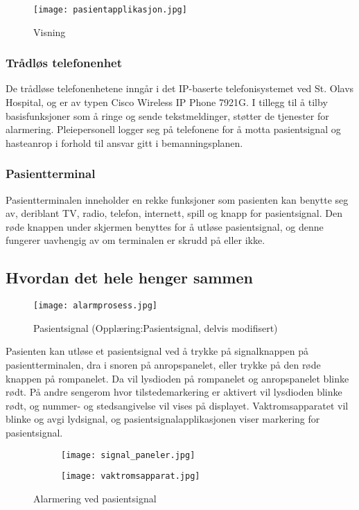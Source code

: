 \begin{figure}[H]
\centering
\texttt{[image: pasientapplikasjon.jpg]}
\caption{Visning}
\label{visning}
\end{figure}

\subsubsection{Trådløs telefonenhet}
De trådløse telefonenhetene inngår i det IP-baserte telefonisystemet ved St. Olavs Hospital, og er av typen Cisco Wireless IP Phone 7921G. I tillegg til å tilby basisfunksjoner som å ringe og sende tekstmeldinger, støtter de tjenester for alarmering. Pleiepersonell logger seg på telefonene for å motta pasientsignal og hasteanrop i forhold til ansvar gitt i bemanningsplanen.

\subsubsection{Pasientterminal}
Pasientterminalen inneholder en rekke funksjoner som pasienten kan benytte seg av, deriblant TV, radio, telefon, internett, spill og knapp for pasientsignal. Den røde knappen under skjermen benyttes for å utløse pasientsignal, og denne fungerer uavhengig av om terminalen er skrudd på eller ikke.

\pagebreak

\subsection{Hvordan det hele henger sammen}
\begin{figure}[H]
\centering
\texttt{[image: alarmprosess.jpg]}
\caption{Pasientsignal (Opplæring:Pasientsignal, delvis modifisert)}
\label{alarmprosess}
\end{figure}

\noindent
Pasienten kan utløse et pasientsignal ved å trykke på signalknappen på pasientterminalen, dra i snoren på anropspanelet, eller trykke på den røde knappen på rompanelet. Da vil lysdioden på rompanelet og anropspanelet blinke rødt. På andre sengerom hvor tilstedemarkering er aktivert vil lysdioden blinke rødt, og nummer- og stedsangivelse vil vises på displayet. Vaktromsapparatet vil blinke og avgi lydsignal, og pasientsignalapplikasjonen viser markering for pasientsignal.

\begin{figure}[H]
        \centering
        \begin{subfigure}[b]{0.35\textwidth}
        		\centering
                \texttt{[image: signal\_paneler.jpg]}
        \end{subfigure}
        \begin{subfigure}[b]{0.35\textwidth}
        		\centering
                \texttt{[image: vaktromsapparat.jpg]}
                \label{telefon}
        \end{subfigure}
        \caption{Alarmering ved pasientsignal}\label{pasientsignalalarm}
\end{figure}

